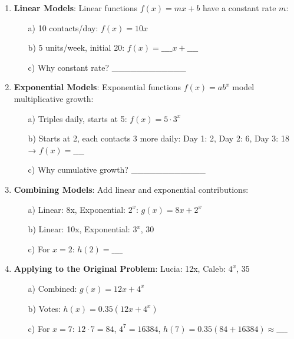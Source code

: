 \documentclass[12pt]{article}
\begin{document}
\begin{enumerate}[label=33.\arabic*]
    \item \textbf{Linear Models}: Linear functions \( f(x) = mx + b \) have a constant rate \( m \):
    \begin{enumerate}
        \item[a)] 10 contacts/day: \( f(x) = 10x \)
        \item[b)] 5 units/week, initial 20: \( f(x) = \_\_\_\_x + \_\_\_\_ \)
        \item[c)] Why constant rate? \_\_\_\_\_\_\_\_\_\_\_\_
    \end{enumerate}
    \item \textbf{Exponential Models}: Exponential functions \( f(x) = ab^x \) model multiplicative growth:
    \begin{enumerate}
        \item[a)] Triples daily, starts at 5: \( f(x) = 5 \cdot 3^x \)
        \item[b)] Starts at 2, each contacts 3 more daily: Day 1: 2, Day 2: 6, Day 3: 18 → \( f(x) = \_\_\_\_ \)
        \item[c)] Why cumulative growth? \_\_\_\_\_\_\_\_\_\_\_\_
    \end{enumerate}
    \item \textbf{Combining Models}: Add linear and exponential contributions:
    \begin{enumerate}
        \item[a)] Linear: 8x, Exponential: \( 2^x \): \( g(x) = 8x + 2^x \)
        \item[b)] Linear: 10x, Exponential: \( 3^x \), 30%
        \item[c)] For \( x = 2 \): \( h(2) = \_\_\_\_ \)
    \end{enumerate}
    \item \textbf{Applying to the Original Problem}: Lucia: 12x, Caleb: \( 4^x \), 35%
    \begin{enumerate}
        \item[a)] Combined: \( g(x) = 12x + 4^x \)
        \item[b)] Votes: \( h(x) = 0.35(12x + 4^x) \)
        \item[c)] For \( x = 7 \): \( 12 \cdot 7 = 84 \), \( 4^7 = 16384 \), \( h(7) = 0.35(84 + 16384) \approx \_\_\_\_ \)
    \end{enumerate}
\end{enumerate}

\end{document}
